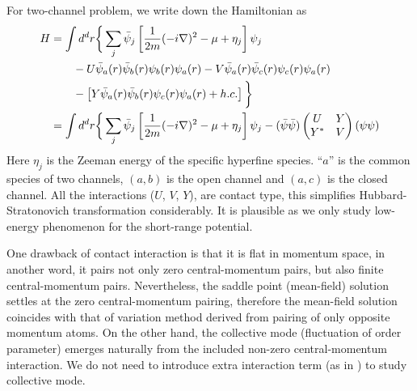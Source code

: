 For two-channel problem, we write down the Hamiltonian as
\begin{equation}\label{eq:pathInt2:ham2}
\begin{split}
H&=\int{d^{d}r}\bigg\{\sum_{j}\bar\psi_{j}\left[\frac{1}{2m}(-i\nabla)^{2}-\mu+\eta_{j}\right]\psi_{j}\\
	&\qquad-U\bar\psi_{a}(r)\bar\psi_{b}(r)\psi_{b}(r)\psi_{a}(r)-V\bar\psi_{a}(r)\bar\psi_{c}(r)\psi_{c}(r)\psi_{a}(r)\\
	&\qquad-\left[Y\bar\psi_{a}(r)\bar\psi_{b}(r)\psi_{c}(r)\psi_{a}(r)+h.c.\right]
	\bigg\}\\
 &=\int{d^{d}r}\bigg\{\sum_{j}\bar\psi_{j}\left[\frac{1}{2m}(-i\nabla)^{2}-\mu+\eta_{j}\right]\psi_{j}
 	-(\bar\psi\bar\psi)\begin{pmatrix}U&Y\\Y^{*}&V\end{pmatrix}(\psi\psi)
\end{split}
\end{equation}
Here $\eta_{j}$ is the Zeeman energy of the specific hyperfine species.  ``$a$'' is the common species of two channels, $(a,b)$ is the open channel and $(a,c)$ is the closed channel.  All the interactions ($U$, $V$, $Y$), are contact type, this simplifies Hubbard-Stratonovich transformation considerably.  It is plausible as we only study low-energy phenomenon for the short-range potential. 

One drawback of contact interaction is that it is flat in momentum space, in another word, it pairs not only zero central-momentum pairs, but also finite central-momentum pairs.  Nevertheless, the saddle point (mean-field) solution settles at the zero central-momentum pairing, therefore the mean-field solution coincides with that of  variation method derived from pairing of only opposite momentum atoms.  On the other hand, the collective mode (fluctuation of order parameter) emerges naturally from the included non-zero central-momentum interaction.  We do not need to introduce extra interaction term (as in \cite{AndersonBCS}) to study collective mode.   

